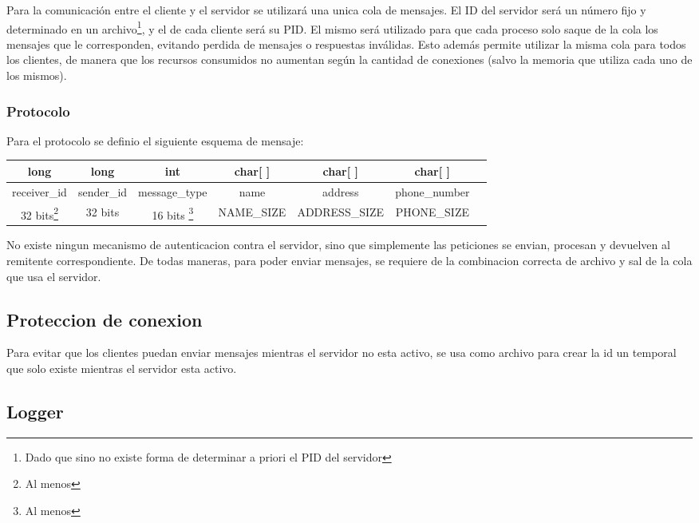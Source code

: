 \documentclass[11pt,spanish,a4paper,openany,notitlepage]{article}
\begin{document}
Para la comunicación entre el cliente y el servidor se utilizará una unica cola de mensajes. El ID del servidor será un número fijo y determinado en un archivo\footnote{Dado que sino no existe forma de determinar a priori el PID del servidor}, y el de cada cliente será su PID. El mismo será utilizado para que cada proceso solo saque de la cola los mensajes que le corresponden, evitando perdida de mensajes o respuestas inválidas. Esto además permite utilizar la misma cola para todos los clientes, de manera que los recursos consumidos no aumentan según la cantidad de conexiones (salvo la memoria que utiliza cada uno de los mismos).

\subsubsection{Protocolo}

Para el protocolo se definio el siguiente esquema de mensaje:

\begin{center}
\begin{tabular}{|c|c|c|c|c|c|c|}\hline
long&long&int&char[ ]&char[ ]&char[ ]\\\hline
receiver\_id&sender\_id&message\_type&name&address&phone\_number\\\hline
32 bits\footnote{Al menos}&32 bits&16 bits \footnote{Al menos}&NAME\_SIZE &ADDRESS\_SIZE &PHONE\_SIZE \\\hline
   
\end{tabular}
\end{center}

No existe ningun mecanismo de autenticacion contra el servidor, sino que simplemente las peticiones se envian, procesan y devuelven al remitente correspondiente. De todas maneras, para poder enviar mensajes, se requiere de la combinacion correcta de archivo y sal de la cola que usa el servidor.

\subsection{Proteccion de conexion}

Para evitar que los clientes puedan enviar mensajes mientras el servidor no esta activo, se usa como archivo para crear la id un temporal que solo existe mientras el servidor esta activo.

\subsection{Logger}
\end{document}
